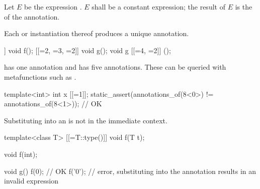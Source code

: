 \pnum
Let $E$ be the expression
.
$E$ shall be a constant expression;
the result of $E$ is the  of the annotation.

\pnum
Each  or instantiation thereof
produces a unique annotation.
\begin{example}
\begin{codeblock}
[[=1]] void f();
[[=2, =3, =2]] void g();
void g [[=4, =2]] ();
\end{codeblock}
 has one annotation
and  has five annotations.
These can be queried with metafunctions
such as .
\end{example}
\begin{example}
\begin{codeblock}
template<int> int x [[=1]];
static_assert(annotations_of(^^x<0>) != annotations_of(^^x<1>));    // OK
\end{codeblock}
\end{example}

\pnum
Substituting into an 
is not in the immediate context.
\begin{example}
\begin{codeblock}
template<class T>
  [[=T::type()]] void f(T t);

void f(int);

void g() {
  f(0);         // OK
  f('0');       // error, substituting into the annotation results in an invalid expression
}
\end{codeblock}
\end{example}

%
